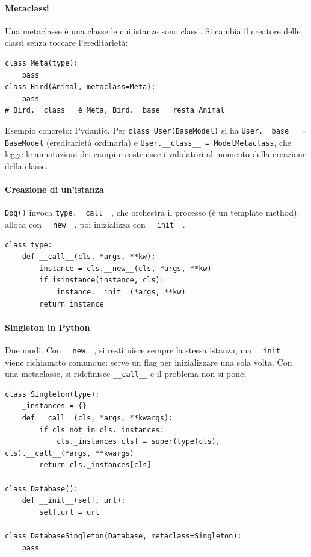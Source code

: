 \documentclass[a4paper,12pt]{article}
\begin{document}
\paragraph{Metaclassi} Una metaclasse è una classe le cui istanze sono classi. Si cambia il
creatore delle classi senza toccare l'ereditarietà:
\begin{verbatim}
class Meta(type):
    pass
class Bird(Animal, metaclass=Meta):
    pass
# Bird.__class__ è Meta, Bird.__base__ resta Animal
\end{verbatim}
Esempio concreto: Pydantic. Per \texttt{class User(BaseModel)} si ha
\texttt{User.\_\_base\_\_ = BaseModel} (ereditarietà ordinaria) e
\texttt{User.\_\_class\_\_ = ModelMetaclass}, che legge le annotazioni dei campi e costruisce
i validatori al momento della creazione della classe.

\paragraph{Creazione di un'istanza} \texttt{Dog()} invoca \texttt{type.\_\_call\_\_}, che
orchestra il processo (è un template method): alloca con \texttt{\_\_new\_\_}, poi inizializza
con \texttt{\_\_init\_\_}.
\begin{verbatim}
class type:
    def __call__(cls, *args, **kw):
        instance = cls.__new__(cls, *args, **kw)
        if isinstance(instance, cls):
            instance.__init__(*args, **kw)
        return instance
\end{verbatim}

\paragraph{Singleton in Python} Due modi. Con \texttt{\_\_new\_\_}, si restituisce sempre la
stessa istanza, ma \texttt{\_\_init\_\_} viene richiamato comunque: serve un flag per
inizializzare una sola volta. Con una metaclasse, si ridefinisce \texttt{\_\_call\_\_} e il
problema non si pone:
\begin{verbatim}
class Singleton(type):
    _instances = {}
    def __call__(cls, *args, **kwargs):
        if cls not in cls._instances:
            cls._instances[cls] = super(type(cls), cls).__call__(*args, **kwargs)
        return cls._instances[cls]

class Database():
    def __init__(self, url):
        self.url = url

class DatabaseSingleton(Database, metaclass=Singleton):
    pass
\end{verbatim}
\end{document}
